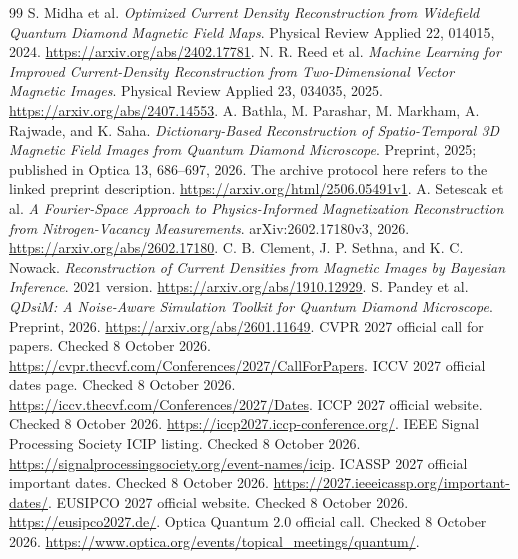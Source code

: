 \begin{thebibliography}{99}
 S. Midha et al. \emph{Optimized Current Density Reconstruction from Widefield Quantum Diamond Magnetic Field Maps}. Physical Review Applied 22, 014015, 2024. \url{https://arxiv.org/abs/2402.17781}.
 N. R. Reed et al. \emph{Machine Learning for Improved Current-Density Reconstruction from Two-Dimensional Vector Magnetic Images}. Physical Review Applied 23, 034035, 2025. \url{https://arxiv.org/abs/2407.14553}.
 A. Bathla, M. Parashar, M. Markham, A. Rajwade, and K. Saha. \emph{Dictionary-Based Reconstruction of Spatio-Temporal 3D Magnetic Field Images from Quantum Diamond Microscope}. Preprint, 2025; published in Optica 13, 686--697, 2026. The archive protocol here refers to the linked preprint description. \url{https://arxiv.org/html/2506.05491v1}.
 A. Setescak et al. \emph{A Fourier-Space Approach to Physics-Informed Magnetization Reconstruction from Nitrogen-Vacancy Measurements}. arXiv:2602.17180v3, 2026. \url{https://arxiv.org/abs/2602.17180}.
 C. B. Clement, J. P. Sethna, and K. C. Nowack. \emph{Reconstruction of Current Densities from Magnetic Images by Bayesian Inference}. 2021 version. \url{https://arxiv.org/abs/1910.12929}.
 S. Pandey et al. \emph{QDsiM: A Noise-Aware Simulation Toolkit for Quantum Diamond Microscope}. Preprint, 2026. \url{https://arxiv.org/abs/2601.11649}.
 CVPR 2027 official call for papers. Checked 8 October 2026. \url{https://cvpr.thecvf.com/Conferences/2027/CallForPapers}.
 ICCV 2027 official dates page. Checked 8 October 2026. \url{https://iccv.thecvf.com/Conferences/2027/Dates}.
 ICCP 2027 official website. Checked 8 October 2026. \url{https://iccp2027.iccp-conference.org/}.
 IEEE Signal Processing Society ICIP listing. Checked 8 October 2026. \url{https://signalprocessingsociety.org/event-names/icip}.
 ICASSP 2027 official important dates. Checked 8 October 2026. \url{https://2027.ieeeicassp.org/important-dates/}.
 EUSIPCO 2027 official website. Checked 8 October 2026. \url{https://eusipco2027.de/}.
 Optica Quantum 2.0 official call. Checked 8 October 2026. \url{https://www.optica.org/events/topical_meetings/quantum/}.
\end{thebibliography}
\endgroup
